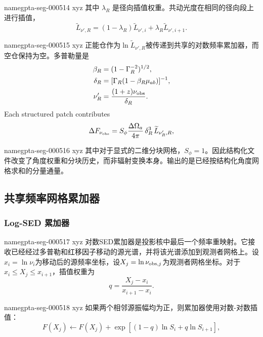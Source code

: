 \documentclass[twocolumn]{aastex702}
\makeatletter
\providecommand{\gptareaderanchor}[1]{\pdfdest name{#1} xyz}%
\providecommand{\gptareaderanchor}[1]{\special{pdf:dest (#1) [ @thispage /XYZ @xpos @ypos null ]}}%
\makeatother
\begin{document}
\gptareaderanchor{gpta-seg-000514}%
其中 \(\lambda_R\) 是径向插值权重。共动光度在相同的径向段上进行插值，
\begin{equation}
\widetilde L_{\nu',R}=(1-\lambda_R)\widetilde L_{\nu',i}
+\lambda_R\widetilde L_{\nu',i+1}.
\end{equation}

\gptareaderanchor{gpta-seg-000515}%
正能仓作为\(\ln \widetilde L_{\nu',R}\)被传递到共享的对数频率累加器，而空仓保持为空。多普勒量是
\begin{equation}
\begin{aligned}
\beta_R&=(1-\Gamma_R^{-2})^{1/2},\\
\delta_R&=[\Gamma_R(1-\beta_R\mu_{ab})]^{-1},\\
\nu'_R&=\frac{(1+z)\nu_{\rm obs}}{\delta_R}.
\end{aligned}
\end{equation}
Each structured patch contributes
\begin{equation}
\Delta F_{\nu_{\rm obs}}=
S_\phi\frac{\Delta\Omega_a}{4\pi}\,
\delta_R^3\,
\widetilde L_{\nu'_R,R},
\end{equation}

\gptareaderanchor{gpta-seg-000516}%
其中对于显式的二维分块网格，\(S_\phi=1\)。因此结构化文件改变了角度权重和分块历史，而非辐射变换本身。输出的是已经按结构化角度网格求和的分量通量。

\subsection{共享频率网格累加器}

\subsubsection{Log-SED 累加器}


\gptareaderanchor{gpta-seg-000517}%
对数SED累加器是投影核中最后一个频率重映射。它接收已经经过多普勒和红移因子移动的源光谱，并将该光谱添加到观测者网格上。设\(x_i=\ln\nu_i\)为移动后的源频率坐标，设\(X_j=\ln\nu_{{\rm obs},j}\)为观测者网格坐标。对于\(x_i\le X_j\le x_{i+1}\)，插值权重为
\begin{equation}
q=\frac{X_j-x_i}{x_{i+1}-x_i}.
\end{equation}

\gptareaderanchor{gpta-seg-000518}%
如果两个相邻源振幅均为正，则累加器使用对数-对数插值：
\begin{equation}
F(X_j)\leftarrow F(X_j)+
\exp\!\left[(1-q)\ln S_i+q\ln S_{i+1}\right],
\end{equation}
\end{document}

